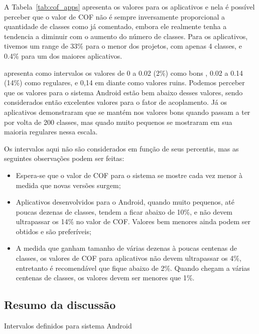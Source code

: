 A Tabela~\ref{tab:cof_apps} apresenta os valores para os aplicativos e nela é possível perceber que o valor de COF não é sempre inversamente proporcional a quantidade de classes como já comentado, embora ele realmente tenha a tendencia a diminuir com o aumento do número de classes. Para os aplicativos, tivemos um range de 33\% para o menor dos projetos, com apenas 4 classes, e 0.4\% para um dos maiores aplicativos.

 apresenta como intervalos os valores de 0 a 0.02 (2\%) como bons , 0.02 a 0.14 (14\%) como regulares, e 0,14 em diante como valores ruins. Podemos perceber que os valores para o sistema Android estão bem abaixo desses valores, sendo considerados então excelentes valores para o fator de acoplamento. Já os aplicativos demonstraram que se mantém nos valores bons quando passam a ter por volta de 200 classes, mas quado muito pequenos se mostraram em sua maioria regulares nessa escala. 

Os intervalos aqui não são considerados em função de seus percentis, mas as seguintes observações podem ser feitas:

\begin{itemize}
\item Espera-se que o valor de COF para o sistema se mostre cada vez menor à medida que novas versões surgem;
\item Aplicativos desenvolvidos para o Android, quando muito pequenos, até poucas dezenas de classes, tendem a ficar abaixo de 10\%, e não devem ultrapassar os 14\% no valor de COF. Valores bem menores ainda podem ser obtidos e são preferíveis;
\item A medida que ganham tamanho de várias dezenas à poucas centenas de classes, os valores de COF para aplicativos não devem ultrapassar os 4\%, entretanto é recomendável que fique abaixo de 2\%. Quando chegam a várias centenas de classes, os valores devem ser menores que 1\%.
\end{itemize}

\subsection{Resumo da discussão}

\begin{table}[!htb]
\centering
{}

\caption{Intervalos definidos para sistema Android}
\label{tab:final_table_android}
\end{table}

